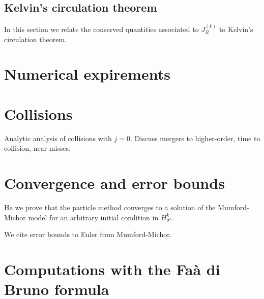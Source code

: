 \documentclass[12pt]{amsart}
\begin{document}
  \subsection{Kelvin's circulation theorem}
  \label{sec:Kelvin}
  In this section we relate the conserved quantities associated
  to $J_R^{(k)}$ to Kelvin's circulation theorem.

\section{Numerical expirements}
\label{sec:Numerical expirements}


\section{Collisions}
\label{sec:collisions}
Analytic analysis of collisions with $j=0$.
Discuss mergers to higher-order, time to collision, near misses.


\appendix
\section{Convergence and error bounds}
\label{sec:Convergence}
He we prove that the particle method converges to a solution of the Mumford-Michor model for an arbitrary initial condition in $H^k_{\sigma^2}$.

We cite error bounds to Euler from Mumford-Michor.


\section{Computations with the Fa\`a di Bruno formula}
\label{app:FaadiBruno}




\end{document}
